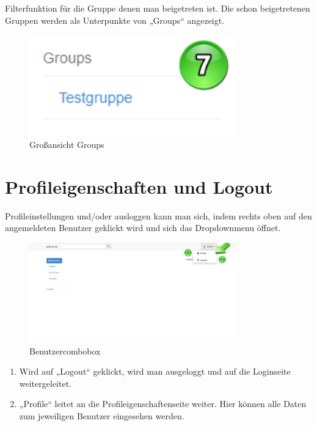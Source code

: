 Filterfunktion für die Gruppe denen man beigetreten ist. Die schon beigetretenen Gruppen werden als Unterpunkte von „Groups“ angezeigt.


\begin{figure}[H]
    \centering
    \includegraphics[width=0.8\textwidth]{Bilder/39.png}
    \caption{Großansicht Groups }
    \label{fig:grossansicht_groups}
\end{figure}


\chapter{Profileigenschaften und Logout}

Profileinstellungen und/oder ausloggen kann man sich, indem rechts oben auf den angemeldeten Benutzer geklickt wird und sich das Dropdownmenu öffnet.

\begin{figure}[H]
    \centering
    \includegraphics[width=0.8\textwidth]{Bilder/7.png}
    \caption{Benutzercombobox }
    \label{fig:beuntzercombobox}
\end{figure}



\begin{enumerate}
\item Wird auf „Logout“ geklickt, wird man ausgeloggt und auf die Loginseite weitergeleitet.
\item „Profile“ leitet an die Profileigenschaftenseite weiter. Hier können alle Daten zum jeweiligen Benutzer eingesehen werden.
\end{enumerate}




